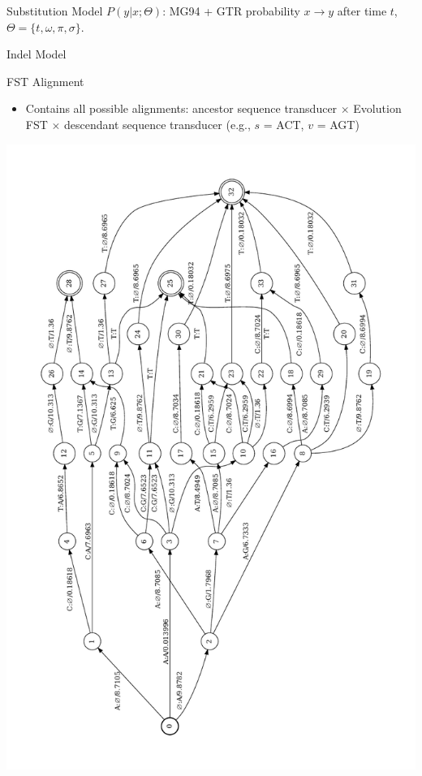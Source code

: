 \documentclass[aspectratio=169,font=14pt]{beamer}
\begin{document}
\begin{frame}[c]{Substitution Model} %
$P(y|x;\Theta)$: MG94 + GTR probability $x \rightarrow y$ after time $t$, $\Theta = \{t, \omega, \pi, \sigma\}$.

\vspace{2em}

\centering
\hspace*{-4em}\resizebox{\textwidth}{!}{}
\end{frame} %

\begin{frame}{Indel Model} %
\centering
\vspace*{-2em}\hspace*{-2em}\resizebox{!}{\textheight}{}
\end{frame} %

\begin{frame}[t]{FST Alignment} %
\begin{itemize}
    \item Contains all possible alignments: ancestor sequence transducer $\times$ Evolution FST $\times$ descendant sequence transducer (e.g., $s$ = ACT, $v$ = AGT)
\end{itemize}
\centering
\vspace*{-1em}\includegraphics[width=\textheight,height=0.65\textwidth,keepaspectratio,angle=-90]{defense/figures/graph-fst.pdf}
\end{frame} %
\end{document}
